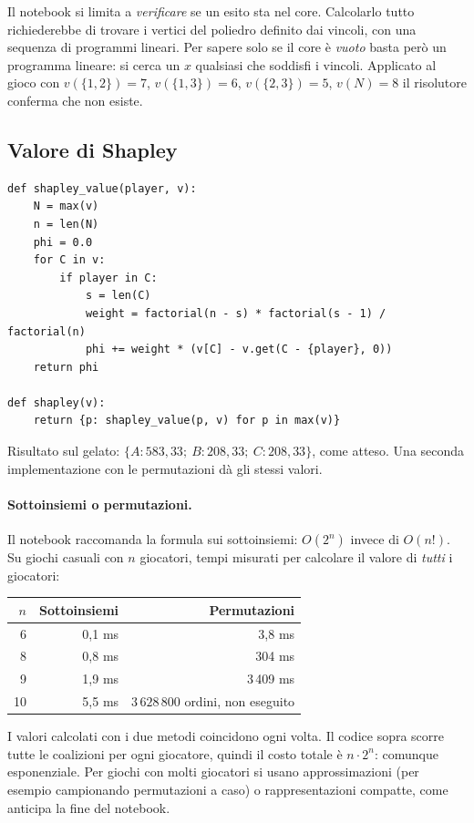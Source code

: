 \begin{osservazione}
Il notebook si limita a \emph{verificare} se un esito sta nel core. Calcolarlo tutto
richiederebbe di trovare i vertici del poliedro definito dai vincoli, con una sequenza di
programmi lineari. Per sapere solo se il core è \emph{vuoto} basta però un programma
lineare: si cerca un $x$ qualsiasi che soddisfi i vincoli. Applicato al gioco con
$v(\{1,2\}) = 7$, $v(\{1,3\}) = 6$, $v(\{2,3\}) = 5$, $v(N) = 8$ il risolutore conferma che
non esiste.
\end{osservazione}

\subsection{Valore di Shapley}

\begin{lstlisting}
def shapley_value(player, v):
    N = max(v)
    n = len(N)
    phi = 0.0
    for C in v:
        if player in C:
            s = len(C)
            weight = factorial(n - s) * factorial(s - 1) / factorial(n)
            phi += weight * (v[C] - v.get(C - {player}, 0))
    return phi

def shapley(v):
    return {p: shapley_value(p, v) for p in max(v)}
\end{lstlisting}

Risultato sul gelato: $\{A: 583{,}33;\ B: 208{,}33;\ C: 208{,}33\}$, come atteso. Una seconda
implementazione con le permutazioni dà gli stessi valori.

\paragraph{Sottoinsiemi o permutazioni.}
Il notebook raccomanda la formula sui sottoinsiemi: $O(2^n)$ invece di $O(n!)$. Su giochi
casuali con $n$ giocatori, tempi misurati per calcolare il valore di \emph{tutti} i giocatori:
\begin{center}
\renewcommand{\arraystretch}{1.2}
\begin{tabular}{rrr}
\toprule
$n$ & Sottoinsiemi & Permutazioni \\
\midrule
6  & 0,1 ms & 3,8 ms \\
8  & 0,8 ms & 304 ms \\
9  & 1,9 ms & 3\,409 ms \\
10 & 5,5 ms & $3\,628\,800$ ordini, non eseguito \\
\bottomrule
\end{tabular}
\end{center}
I valori calcolati con i due metodi coincidono ogni volta. Il codice sopra scorre tutte le
coalizioni per ogni giocatore, quindi il costo totale è $n\cdot 2^n$: comunque esponenziale.
Per giochi con molti giocatori si usano approssimazioni (per esempio campionando permutazioni
a caso) o rappresentazioni compatte, come anticipa la fine del notebook.

